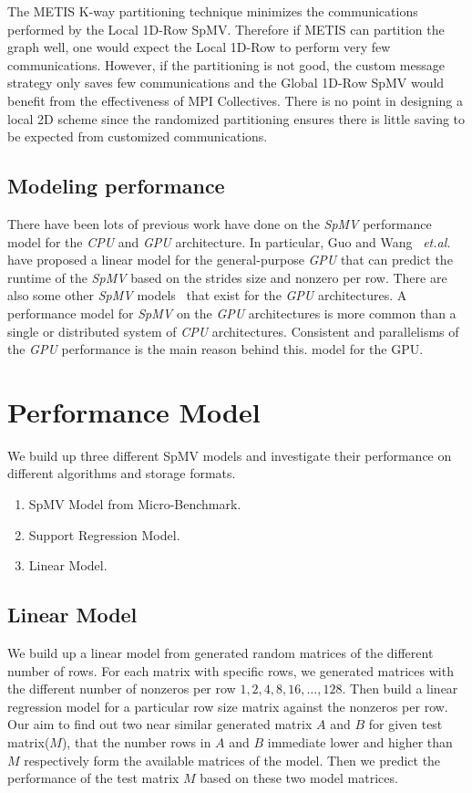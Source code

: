 \documentclass[sigconf,review,anonymous]{acmart}
\begin{document}
The METIS K-way partitioning technique minimizes the communications
performed by the Local 1D-Row SpMV. Therefore if METIS can partition
the graph well, one would expect the Local 1D-Row to perform very few
communications. However, if the partitioning is not good, the custom
message strategy only saves few communications and the Global 1D-Row
SpMV would benefit from the effectiveness of MPI Collectives. There is
no point in designing a local 2D scheme since the randomized
partitioning ensures there is little saving to be expected from
customized communications.

\subsection{Modeling performance}

There have been lots of previous work have done on the \textit{SpMV}
performance model for the \textit{CPU} and \textit{GPU}
architecture. In particular, Guo and Wang~\cite{guo2013performance}
\textit{et.al.} have proposed a linear model for the general-purpose
\textit{GPU} that can predict the runtime of the \textit{SpMV} based
on the strides size and nonzero per row. There are also some other
\textit{SpMV} models~\cite{nisa2018effective,guo2018performance} that
exist for the \textit{GPU} architectures. A performance model for
\textit{SpMV} on the \textit{GPU} architectures is more common than a
single or distributed system of \textit{CPU} architectures. Consistent
and parallelisms of the \textit{GPU} performance is the main reason
behind this.
model for the GPU. 


\section{Performance Model}
\label{sec:perfmodel}

We build up three different SpMV models and investigate their performance on different algorithms and
storage formats.
\begin{enumerate}
\item SpMV Model from Micro-Benchmark.
\item Support Regression Model.
\item Linear Model.
\end{enumerate} 

\subsection{Linear Model}
\label{sec:linear-2d-spmv}
We build up a linear model from generated random matrices of the different
number of rows. For each matrix with specific rows, we generated
matrices with the different number of nonzeros per row $1, 2, 4, 8, 16,
\dots, 128$. Then build a linear regression model for a particular row
size matrix against the nonzeros per row. Our aim to find out two near
similar generated matrix $A$ and $B$ for given test matrix($M$), that
the number rows in $A$ and $B$ immediate lower and higher than $M$
respectively form the available matrices of the model. Then we predict
the performance of the test matrix $M$ based on these two model
matrices.
\end{document}
